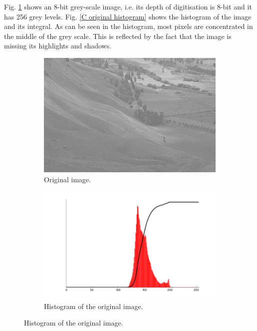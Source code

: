 \documentclass[12pt, conference]{IEEEtran}
\begin{document}
Fig. \ref{C original} shows an 8-bit grey-scale image, i.e. its depth of digitisation is 8-bit and it has 256 grey levels. Fig. \ref{C original histogram} shows the histogram of the image and its integral. As can be seen in the histogram, most pixels are concentrated in the middle of the grey scale. This is reflected by the fact that the image is missing its highlights and shadows.

\begin{figure}[htbp]
    \centering
    \begin{subfigure}{0.4\textwidth}
        \centering
        \includegraphics[width=1\textwidth]{Images/C original.jpg}
        \caption{Original image.}
        \label{C original}
    \end{subfigure}
    \begin{subfigure}{0.4\textwidth}
        \centering
        \includegraphics[width=1\textwidth]{Images/C original histogram.png}
        \caption{Histogram of the original image.}

\end{subfigure}
\end{figure}
\end{document}
